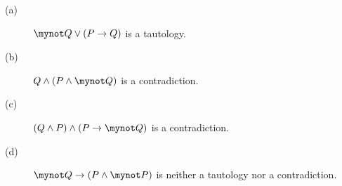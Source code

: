 %
%
%
%
%
%
%

\begin{list}{\bf{\ref{exer:tautology-contra}.}}
\item \begin{description} 
\item [(a)] $\mynot Q \vee (P \to Q)$ is a tautology.
\item [(b)] $Q \wedge (P \wedge \mynot Q)$ is a contradiction.
\item [(c)] $(Q \wedge P) \wedge (P \to \mynot Q)$ is a contradiction.
\item [(d)] $\mynot Q \to (P \wedge \mynot P)$ is neither a tautology nor a contradiction. 
\end{description}
\end{list}

\hbreak
%
